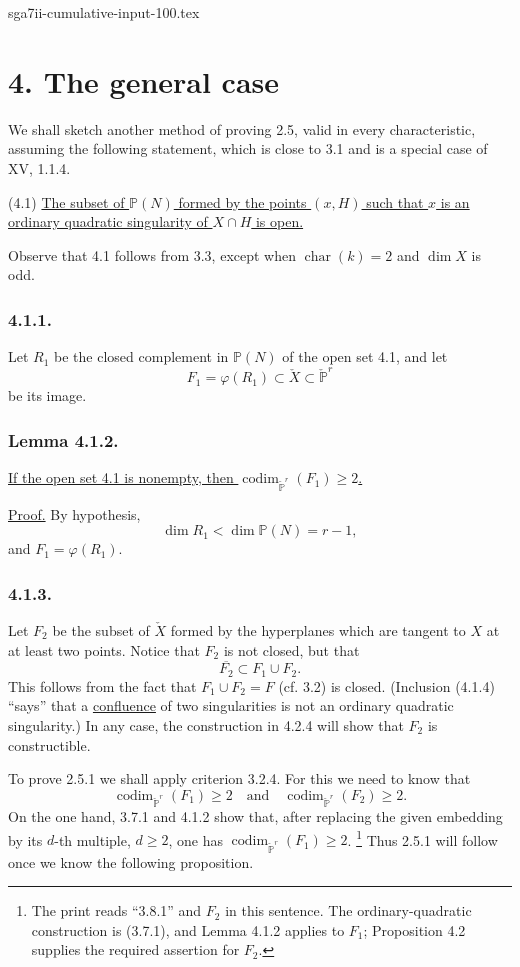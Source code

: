 \begin{filecontents*}{sga7ii-cumulative-input-100.tex}
\section*{4. The general case}

We shall sketch another method of proving 2.5, valid in every
characteristic, assuming the following statement, which is close to
3.1 and is a special case of XV, 1.1.4.

\medskip
\noindent(4.1) \underline{The subset of $\mathbb P(N)$ formed by the
points $(x,H)$ such that $x$ is an ordinary quadratic singularity of
$X\cap H$ is open.}

Observe that 4.1 follows from 3.3, except when
$\operatorname{char}(k)=2$ and $\dim X$ is odd.

\subsubsection*{4.1.1.}
Let $R_1$ be the closed complement in $\mathbb P(N)$ of the open set
4.1, and let
\[
F_1=\varphi(R_1)\subset\check X\subset\check{\mathbb P}^{r}
\]
be its image.

\subsubsection*{Lemma 4.1.2.}
\underline{If the open set 4.1 is nonempty, then
$\operatorname{codim}_{\check{\mathbb P}^{r}}(F_1)\geq2$.}

\noindent\underline{Proof.}
By hypothesis,
\[
\dim R_1<\dim\mathbb P(N)=r-1,
\]
and $F_1=\varphi(R_1)$.

\subsubsection*{4.1.3.}
Let $F_2$ be the subset of $\check X$ formed by the hyperplanes which
are tangent to $X$ at at least two points.  Notice that $F_2$ is not
closed, but that
\begin{equation}\tag{4.1.4}
\overline{F_2}\subset F_1\cup F_2.
\end{equation}
This follows from the fact that $F_1\cup F_2=F$ (cf. 3.2) is closed.
(Inclusion (4.1.4) ``says'' that a \underline{confluence} of two
singularities is not an ordinary quadratic singularity.)  In any
case, the construction in 4.2.4 will show that $F_2$ is constructible.

To prove 2.5.1 we shall apply criterion 3.2.4.  For this we need to
know that
\[
\operatorname{codim}_{\check{\mathbb P}^{r}}(F_1)\geq2
\quad\text{and}\quad
\operatorname{codim}_{\check{\mathbb P}^{r}}(F_2)\geq2.
\]
On the one hand, 3.7.1 and 4.1.2 show that, after replacing the given
embedding by its $d$-th multiple, $d\geq2$, one has
$\operatorname{codim}_{\check{\mathbb P}^{r}}(F_1)\geq2$.
\footnote{The print reads ``3.8.1'' and $F_2$ in this sentence.  The
ordinary-quadratic construction is (3.7.1), and Lemma 4.1.2 applies
to $F_1$; Proposition 4.2 supplies the required assertion for $F_2$.}
Thus 2.5.1 will follow once we know the following proposition.


\end{filecontents*}
